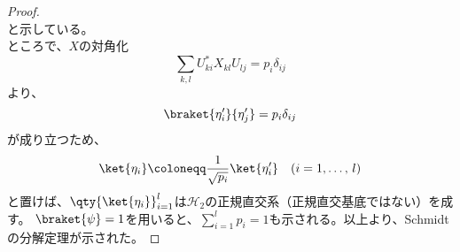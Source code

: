 \documentclass[a4paper,11pt,uplatex]{jsarticle}%
\begin{document}
\begin{proof}
{\begin{equation}
  \end{equation}
  と示している。}
  \\
  ところで、$X$の対角化
  \begin{equation}
    \sum_{k,l}U^{*}_{ki}X_{kl}U_{lj} = p_i\delta_{ij}
  \end{equation}
  より、
  \begin{equation}
    \braket{\eta_i'}{\eta_j'} = p_i\delta_{ij}
  \end{equation}
  が成り立つため、
  \begin{equation}
    \ket{\eta_i}\coloneqq \frac{1}{\sqrt{p_i}}\ket{\eta_i'}\quad(i=1,\ldots,\,l)
  \end{equation}
  と置けば、$\qty{\ket{\eta_i}}_{i=1}^{l}$は$\mathcal{H}_2$の正規直交系（正規直交基底ではない）を成す。
  $\braket{\psi}=1$を用いると、$\sum_{i=1}^{l}p_i=1$も示される。以上より、Schmidtの分解定理が示された。

  
  
  
\end{proof}
\end{document}

